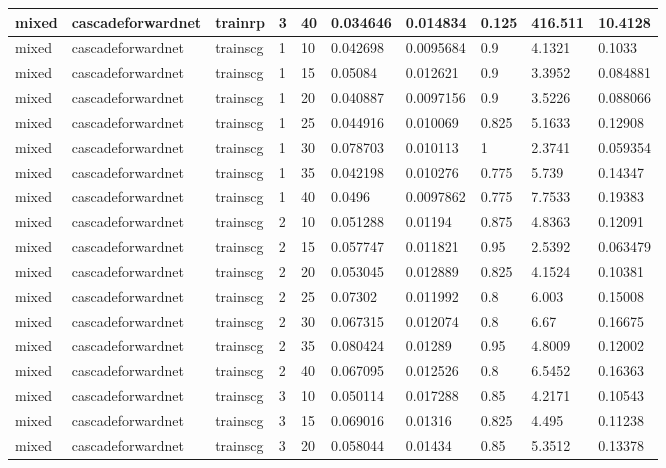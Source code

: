 \begin{longtable}{lllllllll}
mixed & cascadeforwardnet & trainrp & 3 & 40 & 0.034646 & 0.014834 & 0.125 & 416.511 & 10.4128 \\ \hline 
mixed & cascadeforwardnet & trainscg & 1 & 10 & 0.042698 & 0.0095684 & 0.9 & 4.1321 & 0.1033 \\ \hline 
mixed & cascadeforwardnet & trainscg & 1 & 15 & 0.05084 & 0.012621 & 0.9 & 3.3952 & 0.084881 \\ \hline 
mixed & cascadeforwardnet & trainscg & 1 & 20 & 0.040887 & 0.0097156 & 0.9 & 3.5226 & 0.088066 \\ \hline 
mixed & cascadeforwardnet & trainscg & 1 & 25 & 0.044916 & 0.010069 & 0.825 & 5.1633 & 0.12908 \\ \hline 
mixed & cascadeforwardnet & trainscg & 1 & 30 & 0.078703 & 0.010113 & 1 & 2.3741 & 0.059354 \\ \hline 
mixed & cascadeforwardnet & trainscg & 1 & 35 & 0.042198 & 0.010276 & 0.775 & 5.739 & 0.14347 \\ \hline 
mixed & cascadeforwardnet & trainscg & 1 & 40 & 0.0496 & 0.0097862 & 0.775 & 7.7533 & 0.19383 \\ \hline 
mixed & cascadeforwardnet & trainscg & 2 & 10 & 0.051288 & 0.01194 & 0.875 & 4.8363 & 0.12091 \\ \hline 
mixed & cascadeforwardnet & trainscg & 2 & 15 & 0.057747 & 0.011821 & 0.95 & 2.5392 & 0.063479 \\ \hline 
mixed & cascadeforwardnet & trainscg & 2 & 20 & 0.053045 & 0.012889 & 0.825 & 4.1524 & 0.10381 \\ \hline 
mixed & cascadeforwardnet & trainscg & 2 & 25 & 0.07302 & 0.011992 & 0.8 & 6.003 & 0.15008 \\ \hline 
mixed & cascadeforwardnet & trainscg & 2 & 30 & 0.067315 & 0.012074 & 0.8 & 6.67 & 0.16675 \\ \hline 
mixed & cascadeforwardnet & trainscg & 2 & 35 & 0.080424 & 0.01289 & 0.95 & 4.8009 & 0.12002 \\ \hline 
mixed & cascadeforwardnet & trainscg & 2 & 40 & 0.067095 & 0.012526 & 0.8 & 6.5452 & 0.16363 \\ \hline 
mixed & cascadeforwardnet & trainscg & 3 & 10 & 0.050114 & 0.017288 & 0.85 & 4.2171 & 0.10543 \\ \hline 
mixed & cascadeforwardnet & trainscg & 3 & 15 & 0.069016 & 0.01316 & 0.825 & 4.495 & 0.11238 \\ \hline 
mixed & cascadeforwardnet & trainscg & 3 & 20 & 0.058044 & 0.01434 & 0.85 & 5.3512 & 0.13378 \\ \hline 

\end{longtable}
